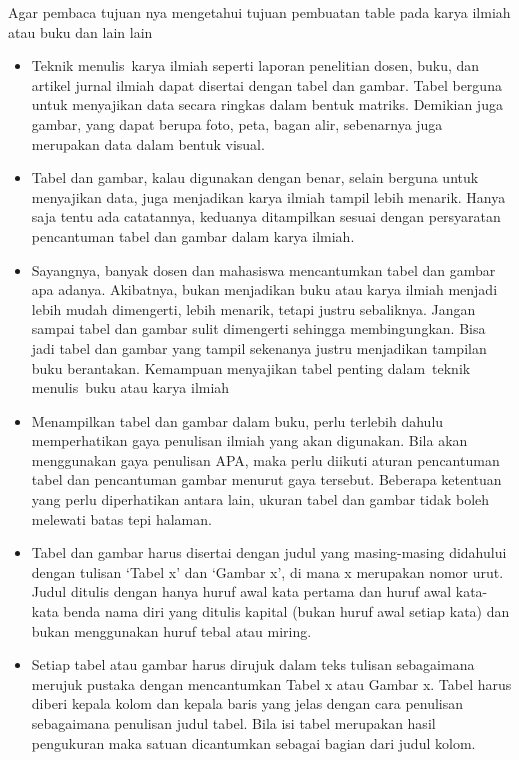 Agar pembaca tujuan nya mengetahui tujuan pembuatan table pada karya ilmiah atau buku dan lain lain\par
\begin{itemize}
	\item Teknik menulis karya ilmiah seperti laporan penelitian dosen, buku, dan artikel jurnal ilmiah dapat disertai dengan tabel dan gambar. Tabel berguna untuk menyajikan data secara ringkas dalam bentuk matriks. Demikian juga gambar, yang dapat berupa foto, peta, bagan alir, sebenarnya juga merupakan data dalam bentuk visual.\par

	\item Tabel dan gambar, kalau digunakan dengan benar, selain berguna untuk menyajikan data, juga menjadikan karya ilmiah tampil lebih menarik. Hanya saja tentu ada catatannya, keduanya ditampilkan sesuai dengan persyaratan pencantuman tabel dan gambar dalam karya ilmiah.\par

	\item Sayangnya, banyak dosen dan mahasiswa mencantumkan tabel dan gambar apa adanya. Akibatnya, bukan menjadikan buku atau karya ilmiah menjadi lebih mudah dimengerti, lebih menarik, tetapi justru sebaliknya. Jangan sampai tabel dan gambar sulit dimengerti sehingga membingungkan. Bisa jadi tabel dan gambar yang tampil sekenanya justru menjadikan tampilan buku berantakan. Kemampuan menyajikan tabel penting dalam teknik menulis buku atau karya ilmiah\par

	\item Menampilkan tabel dan gambar dalam buku, perlu terlebih dahulu memperhatikan gaya penulisan ilmiah yang akan digunakan. Bila akan menggunakan gaya penulisan APA, maka perlu diikuti aturan pencantuman tabel dan pencantuman gambar menurut gaya tersebut. Beberapa ketentuan yang perlu diperhatikan antara lain, ukuran tabel dan gambar tidak boleh melewati batas tepi halaman.\par

	\item Tabel dan gambar harus disertai dengan judul yang masing-masing didahului dengan tulisan ‘Tabel x’ dan ‘Gambar x’, di mana x merupakan nomor urut. Judul ditulis dengan hanya huruf awal kata pertama dan huruf awal kata-kata benda nama diri yang ditulis kapital (bukan huruf awal setiap kata) dan bukan menggunakan huruf tebal atau miring.\par

	\item Setiap tabel atau gambar harus dirujuk dalam teks tulisan sebagaimana merujuk pustaka dengan mencantumkan Tabel x atau Gambar x. Tabel harus diberi kepala kolom dan kepala baris yang jelas dengan cara penulisan sebagaimana penulisan judul tabel. Bila isi tabel merupakan hasil pengukuran maka satuan dicantumkan sebagai bagian dari judul kolom.
\end{itemize}\par


